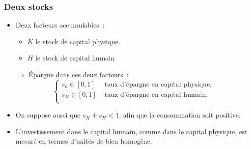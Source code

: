 \documentclass[10pt,notheorems]{beamer}
\theoremstyle{plain}
\theoremstyle{definition} %
\begin{document}
\begin{frame}
  \frametitle{Deux stocks}

  \begin{itemize}

  \item Deux facteurs accumulables~:
    \medskip
    \begin{itemize}
    \item $K$ le stock de capital physique.
    \item $H$ le stock de capital humain
    \end{itemize}

    \bigskip

  \item[$\Rightarrow$] Épargne dans ces deux facteurs~:
    \[
      \begin{cases}
        s_k\in[0,1]&\text{ taux d'épargne en capital physique,}\\
        s_H\in[0,1]&\text{ taux d'épargne en capital humain.}\\
      \end{cases}
    \]

    \bigskip

  \item On suppose aussi que $s_K+s_H<1$, afin que la consommation soit
    positive.\newline

  \item L'investissement dans le capital humain, comme dans le capital physique,
    est mesuré en termes d'unités de bien homogène.
  \end{itemize}

\end{frame}
\end{document}
